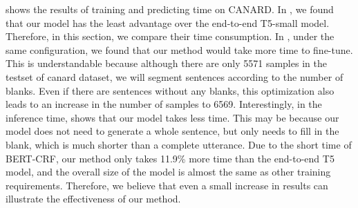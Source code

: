  shows the results of training and predicting time on CANARD. In , we found that our model has the least advantage over the end-to-end T5-small model. Therefore, in this section, we compare their time consumption. In , under the same configuration, we found that our method would take more time to fine-tune. This is understandable because although there are only 5571 samples in the testset of canard dataset, we will segment sentences according to the number of blanks. Even if there are sentences without any blanks, this optimization also leads to an increase in the number of samples to 6569. Interestingly, in the inference time,  shows that our model takes less time. This may be because our model does not need to generate a whole sentence, but only needs to fill in the blank, which is much shorter than a complete utterance. Due to the short time of BERT-CRF, our method only takes 11.9\% more time than the end-to-end T5 model, and the overall size of the model is almost the same as other training requirements. Therefore, we believe that even a small increase in results can illustrate the effectiveness of our method.



